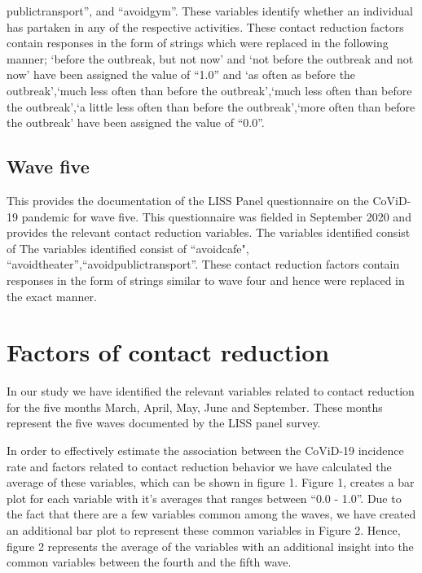 \documentclass[11pt, a4paper, leqno]{article}
\begin{document}
public\textunderscore transport'', and ``avoid\textunderscore gym''. These variables identify whether an individual has partaken in any of the respective activities. These contact reduction factors contain responses in the form of strings which were replaced in the following manner; `before the outbreak, but not now' and `not before the outbreak and not now' have been assigned the value of ``1.0'' and `as often as before the outbreak',`much less often than before the outbreak',`much less often than before the outbreak',`a little less often than before the outbreak',`more often than before the outbreak' have been assigned the value of ``0.0''. 

\subsection{Wave five}
This provides the documentation of the LISS Panel questionnaire on the CoViD-19 pandemic for wave five. This questionnaire was fielded in September 2020 and provides the relevant contact reduction variables. The variables identified consist of The variables identified consist of ``avoid\textunderscore cafe", ``avoid\textunderscore theater'',``avoid\textunderscore public\textunderscore transport''. These contact reduction factors contain responses in the form of strings similar to wave four and hence were replaced in the exact manner.

\section{Factors of contact reduction}


In our study we have identified the relevant variables related to contact reduction for the five months March, April, May, June and September. These months represent the five waves documented by the LISS panel survey. 

In order to effectively estimate the association between the CoViD-19 incidence rate and factors related to contact reduction behavior we have calculated the average of these variables, which can be shown in figure 1. Figure 1, creates a bar plot for each variable with it's averages that ranges between ``0.0 - 1.0''. Due to the fact that there are a few variables common among the waves, we have created an additional bar plot to represent these common variables in Figure 2. Hence, figure 2 represents the average of the variables with an additional insight into the common variables between the fourth and the fifth wave.
\end{document}
